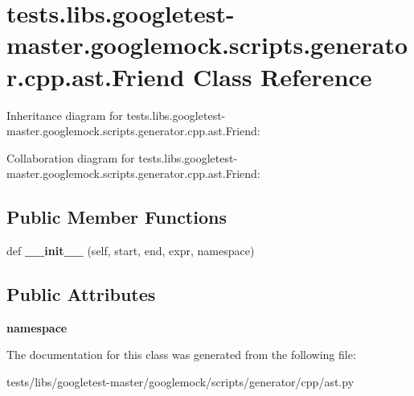 \hypertarget{classtests_1_1libs_1_1googletest-master_1_1googlemock_1_1scripts_1_1generator_1_1cpp_1_1ast_1_1Friend}{}\section{tests.\+libs.\+googletest-\/master.googlemock.\+scripts.\+generator.\+cpp.\+ast.\+Friend Class Reference}
\label{classtests_1_1libs_1_1googletest-master_1_1googlemock_1_1scripts_1_1generator_1_1cpp_1_1ast_1_1Friend}


Inheritance diagram for tests.\+libs.\+googletest-\/master.googlemock.\+scripts.\+generator.\+cpp.\+ast.\+Friend\+:


Collaboration diagram for tests.\+libs.\+googletest-\/master.googlemock.\+scripts.\+generator.\+cpp.\+ast.\+Friend\+:
\subsection*{Public Member Functions}
\begin{DoxyCompactItemize}
\item 
\mbox{\label{classtests_1_1libs_1_1googletest-master_1_1googlemock_1_1scripts_1_1generator_1_1cpp_1_1ast_1_1Friend_acd22ae547f4ba4c18a1603c97970fd78}} 
def {\bfseries \+\_\+\+\_\+init\+\_\+\+\_\+} (self, start, end, expr, namespace)
\end{DoxyCompactItemize}
\subsection*{Public Attributes}
\begin{DoxyCompactItemize}
\item 
\mbox{\label{classtests_1_1libs_1_1googletest-master_1_1googlemock_1_1scripts_1_1generator_1_1cpp_1_1ast_1_1Friend_a18d77481ed7ff86ffdeadd5e0d7bb724}} 
{\bfseries namespace}
\end{DoxyCompactItemize}


The documentation for this class was generated from the following file\+:\begin{DoxyCompactItemize}
\item 
tests/libs/googletest-\/master/googlemock/scripts/generator/cpp/ast.\+py\end{DoxyCompactItemize}
